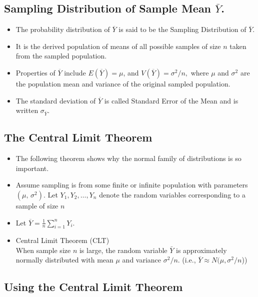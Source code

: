 \documentclass[
  letterpaper,
  DIV=11,
  numbers=noendperiod]{scrartcl}
\begin{document}
\subsection{\texorpdfstring{Sampling Distribution of Sample Mean
\(\bar{Y}\).}{Sampling Distribution of Sample Mean \textbackslash bar\{Y\}.}}\label{sampling-distribution-of-sample-mean-bary.-1}

\begin{itemize}
\item
  The probability distribution of \(\overline{Y}\) is said to be the
  {Sampling Distribution} of \(\overline{Y}\).
\item
  It is the {derived population} of means of all possible samples of
  size \(n\) taken from the sampled population.
\item
  Properties of \(\overline{Y}\) include \(E(\overline{Y}) = \mu\), and
  \(V(\overline{Y}) = \sigma^2/n,\) where \(\mu\) and \(\sigma^2\) are
  the population mean and variance of the original sampled population.
\item
  The standard deviation of \(\overline{Y}\) is called {Standard Error
  of the Mean} and is written \(\sigma_{\overline{Y}}\).
\end{itemize}

\subsection{The Central Limit Theorem}\label{the-central-limit-theorem}

\begin{itemize}
\item
  The following theorem shows why the normal family of distributions is
  so important.
\item
  Assume sampling is from some finite or infinite population with
  parameters \((\mu,\,\sigma^2)\). Let \(Y_1, Y_2, \ldots, Y_n\) denote
  the random variables corresponding to a sample of size \(n\)
\item
  Let \(\overline{Y} = \frac1n \displaystyle\sum_{i=1}^n Y_i\).
\item
  {Central Limit Theorem (CLT)}\\
  When sample size \(n\) is large, the random variable \(\bar{Y}\) is
  approximately normally distributed with mean \(\mu\) and variance
  \(\sigma^2/n\). (i.e., \(\overline{Y} \approx N (\mu, \sigma^2/n\)))
\end{itemize}

\subsection{Using the Central Limit
Theorem}\label{using-the-central-limit-theorem}
\end{document}
